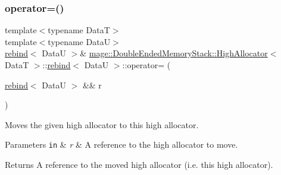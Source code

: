\subsubsection{\texorpdfstring{operator=()}{operator=()}\hspace{0.1cm}{\footnotesize\ttfamily [2/2]}}
{\footnotesize\ttfamily template$<$typename DataT$>$ \\
template$<$typename DataU$>$ \\
\hyperlink{structmage_1_1_double_ended_memory_stack_1_1_high_allocator_1_1rebind}{rebind}$<$ DataU $>$\& \hyperlink{structmage_1_1_double_ended_memory_stack_1_1_high_allocator}{mage\+::\+Double\+Ended\+Memory\+Stack\+::\+High\+Allocator}$<$ DataT $>$\+::\hyperlink{structmage_1_1_double_ended_memory_stack_1_1_high_allocator_1_1rebind}{rebind}$<$ DataU $>$\+::operator= (\begin{DoxyParamCaption}\item[{\hyperlink{structmage_1_1_double_ended_memory_stack_1_1_high_allocator_1_1rebind}{rebind}$<$ DataU $>$ \&\&}]{r }\end{DoxyParamCaption})\hspace{0.3cm}{\ttfamily [delete]}}

Moves the given high allocator to this high allocator.


\begin{DoxyParams}[1]{Parameters}
\mbox{\tt in}  & {\em r} & A reference to the high allocator to move. \\
\hline
\end{DoxyParams}
\begin{DoxyReturn}{Returns}
A reference to the moved high allocator (i.\+e. this high allocator). 
\end{DoxyReturn}
